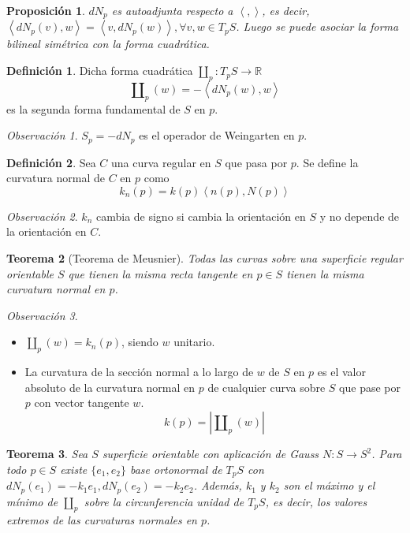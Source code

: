 \documentclass{report}
\newtheorem{theorem}{Teorema}[chapter]
\newtheorem{proposition}[theorem]{Proposición}
\theoremstyle{remark}
\newtheorem*{remark}{Observación}
\theoremstyle{remark}
\theoremstyle{definition}
\newtheorem{definition}{Definición}[chapter]
\theoremstyle{definition}
\theoremstyle{definition}
\begin{document}
\begin{proposition}
    $dN_p$ es autoadjunta respecto a $\left\langle , \right\rangle$, es decir, $\left\langle dN_p(v), w \right\rangle = \left\langle v, dN_p(w) \right\rangle, \forall v, w \in T_pS$.
    Luego se puede asociar la forma bilineal simétrica con la forma cuadrática.
\end{proposition}

\begin{definition}
    Dicha forma cuadrática $\amalg_p : T_pS \to \mathbb{R}$
    $$\amalg_p(w) = -\left\langle dN_p(w), w \right\rangle$$
    es la segunda forma fundamental de $S$ en $p$.
\end{definition}

\begin{remark}
    $S_p = -dN_p$ es el operador de Weingarten en $p$.
\end{remark}

\begin{definition}
    Sea $C$ una curva regular en $S$ que pasa por $p$.
    Se define la curvatura normal de $C$ en $p$ como
    $$k_n(p) = k(p) \left\langle n(p), N(p) \right\rangle$$
\end{definition}

\begin{remark}
    $k_n$ cambia de signo si cambia la orientación en $S$ y no depende de la orientación en $C$.
\end{remark}

\begin{theorem}[Teorema de Meusnier]
    Todas las curvas sobre una superficie regular orientable $S$ que tienen la misma recta tangente en $p \in S$ tienen la misma curvatura normal en $p$.
\end{theorem}

\begin{remark}
    \hfill
    \begin{itemize}
        \item $\amalg_p(w) = k_n(p)$, siendo $w$ unitario.
        \item La curvatura de la sección normal a lo largo de $w$ de $S$ en $p$ es el valor absoluto de la curvatura normal en $p$ de cualquier curva sobre $S$ que pase por $p$ con vector tangente $w$.
              $$k(p) = |\amalg_p(w)|$$
    \end{itemize}
\end{remark}

\begin{theorem}
    Sea $S$ superficie orientable con aplicación de Gauss $N : S \to S^2$.
    Para todo $p \in S$ existe $\{e_1, e_2\}$ base ortonormal de $T_pS$ con $dN_p(e_1) = -k_1e_1, dN_p(e_2) = -k_2e_2$.
    Además, $k_1$ y $k_2$ son el máximo y el mínimo de $\amalg_p$ sobre la circunferencia unidad de $T_pS$, es decir, los valores extremos de las curvaturas normales en $p$.
\end{theorem}
\end{document}

